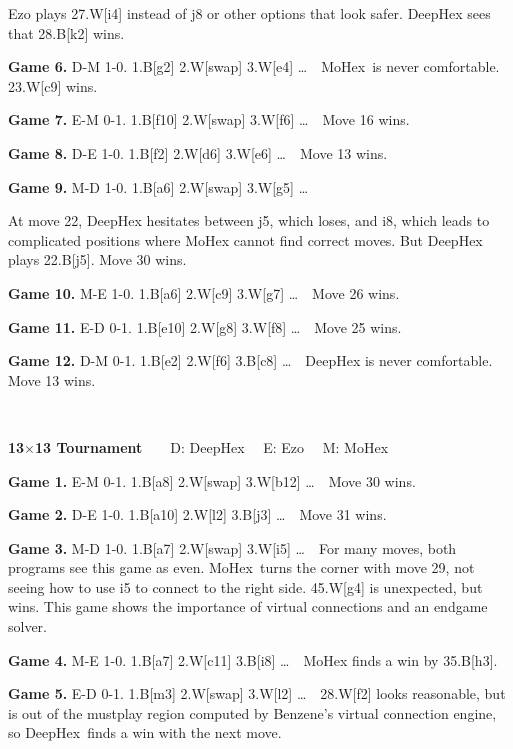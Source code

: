 \documentclass{icga}
\def\Dx{\mbox{\sc DeepHex}}
\def\Eo{\mbox{\sc Ezo}}
\def\Mx{\mbox{\sc MoHex}}
\begin{document}
\hfill\Eo{} plays 27.W[i4] instead of j8 or other options that look safer. \Dx{} sees that 28.B[k2] wins.

{\bf Game 6.}
{\sc D-M 1-0.}
1.B[g2] 2.W[swap] 3.W[e4] \ldots \ \ 
\hfill\Mx\ is never comfortable. 23.W[c9] wins.

{\bf Game 7.}
{\sc E-M 0-1.}
1.B[f10] 2.W[swap] 3.W[f6] \ldots \ \ 
\hfill Move 16 wins.

{\bf Game 8.}
{\sc D-E 1-0.}
1.B[f2] 2.W[d6] 3.W[e6] \ldots \ \ 
\hfill Move 13 wins.

{\bf Game 9.}
{\sc M-D 1-0.}
1.B[a6] 2.W[swap] 3.W[g5] \ldots \ \ 

At move 22, \Dx{} hesitates between j5, which loses, and i8,
which leads to complicated positions where \Mx{} cannot 
find correct moves. But \Dx{} plays 22.B[j5]. Move 30 wins.

{\bf Game 10.}
{\sc M-E 1-0.}
1.B[a6] 2.W[c9] 3.W[g7] \ldots \ \ 
\hfill Move 26 wins.

{\bf Game 11.}
{\sc E-D 0-1.}
1.B[e10] 2.W[g8] 3.W[f8] \ldots \ \ 
\hfill Move 25 wins.

{\bf Game 12.}
{\sc D-M 0-1.}
1.B[e2] 2.W[f6] 3.B[c8] \ldots \ \ 
\hfill\Dx{} is never comfortable. Move 13 wins.

~

{\large\bf 13$\times$13 Tournament} 
~ ~ {\sc D: \Dx\ ~ E: \Eo\ ~ M: \Mx}

{\bf Game 1.}
{\sc E-M 0-1.}
1.B[a8] 2.W[swap] 3.W[b12] \ldots \ \ 
\hfill Move 30 wins.

{\bf Game 2.}
{\sc D-E 1-0.}
1.B[a10] 2.W[l2] 3.B[j3] \ldots \ \ 
\hfill Move 31 wins.

{\bf Game 3.}
{\sc M-D 1-0.}
1.B[a7] 2.W[swap] 3.W[i5] \ldots \ \ 
For many moves, both programs see this game as even.
\Mx\ turns the corner with move 29, 
not seeing how to use i5 to connect to the right side.
45.W[g4] is unexpected, but wins.
This game shows the importance of virtual connections and
an endgame solver.

{\bf Game 4.}
{\sc M-E 1-0.}
1.B[a7] 2.W[c11] 3.B[i8] \ldots \ \ 
\hfill\Mx{} finds a win by 35.B[h3].

{\bf Game 5.}
{\sc E-D 0-1.}
1.B[m3] 2.W[swap] 3.W[l2] \ldots \ \ 
28.W[f2] looks reasonable, but is out of the mustplay
region computed by Benzene's virtual connection engine,
so \Dx\ finds a win with the next move.
\end{document}
